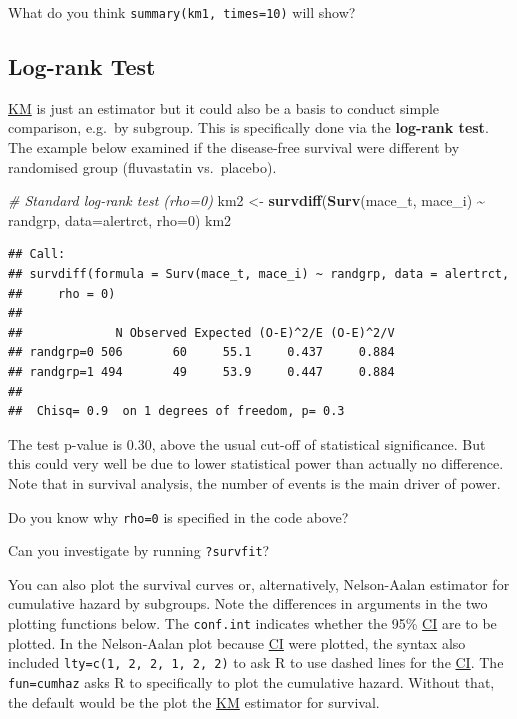 \documentclass[
]{book}
\newenvironment{Shaded}{\begin{snugshade}}{\end{snugshade}}
\newcommand{\AttributeTok}[1]{\textcolor[rgb]{0.13,0.29,0.53}{#1}}
\newcommand{\CommentTok}[1]{\textcolor[rgb]{0.56,0.35,0.01}{\textit{#1}}}
\newcommand{\DecValTok}[1]{\textcolor[rgb]{0.00,0.00,0.81}{#1}}
\newcommand{\FunctionTok}[1]{\textcolor[rgb]{0.13,0.29,0.53}{\textbf{#1}}}
\newcommand{\NormalTok}[1]{#1}
\newcommand{\OtherTok}[1]{\textcolor[rgb]{0.56,0.35,0.01}{#1}}
\newcommand{\SpecialCharTok}[1]{\textcolor[rgb]{0.81,0.36,0.00}{\textbf{#1}}}
\begin{document}
What do you think \texttt{summary(km1,\ times=10)} will show?

\subsection{Log-rank Test}\label{log-rank-test}

\hyperref[acronyms_KM]{KM} is just an estimator but it could also be a basis to conduct simple comparison, e.g.~by subgroup. This is specifically done via the \textbf{log-rank test}. The example below examined if the disease-free survival were different by randomised group (fluvastatin vs.~placebo).

\begin{Shaded}
\begin{Highlighting}[]
\CommentTok{\# Standard log{-}rank test (rho=0)}
\NormalTok{km2 }\OtherTok{\textless{}{-}} \FunctionTok{survdiff}\NormalTok{(}\FunctionTok{Surv}\NormalTok{(mace\_t, mace\_i) }\SpecialCharTok{\textasciitilde{}}\NormalTok{ randgrp, }\AttributeTok{data=}\NormalTok{alertrct, }\AttributeTok{rho=}\DecValTok{0}\NormalTok{)}
\NormalTok{km2}
\end{Highlighting}
\end{Shaded}

\begin{verbatim}
## Call:
## survdiff(formula = Surv(mace_t, mace_i) ~ randgrp, data = alertrct, 
##     rho = 0)
## 
##             N Observed Expected (O-E)^2/E (O-E)^2/V
## randgrp=0 506       60     55.1     0.437     0.884
## randgrp=1 494       49     53.9     0.447     0.884
## 
##  Chisq= 0.9  on 1 degrees of freedom, p= 0.3
\end{verbatim}

The test p-value is 0.30, above the usual cut-off of statistical significance. But this could very well be due to lower statistical power than actually no difference. Note that in survival analysis, the number of events is the main driver of power.

Do you know why \texttt{rho=0} is specified in the code above?

Can you investigate by running \texttt{?survfit}?

You can also plot the survival curves or, alternatively, Nelson-Aalan estimator for cumulative hazard by subgroups. Note the differences in arguments in the two plotting functions below. The \texttt{conf.int} indicates whether the 95\% \hyperref[acronyms_CI]{CI} are to be plotted. In the Nelson-Aalan plot because \hyperref[acronyms_CI]{CI} were plotted, the syntax also included \texttt{lty=c(1,\ 2,\ 2,\ 1,\ 2,\ 2)} to ask R to use dashed lines for the \hyperref[acronyms_CI]{CI}. The \texttt{fun=\textquotesingle{}cumhaz\textquotesingle{}} asks R to specifically to plot the cumulative hazard. Without that, the default would be the plot the \hyperref[acronyms_KM]{KM} estimator for survival.
\end{document}
